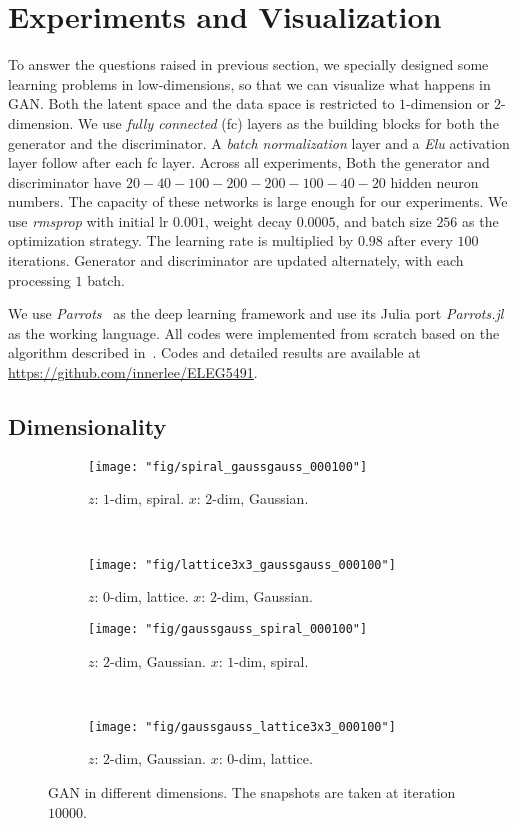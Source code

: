 \section{Experiments and Visualization} \label{sec:exp}

To answer the questions raised in previous section,
we specially designed some learning problems in low-dimensions,
so that we can visualize what happens in GAN.
Both the latent space and the data space is
restricted to $1$-dimension or $2$-dimension.
We use \emph{fully connected} (fc) layers as the building blocks for both
the generator and the discriminator.
A \emph{batch normalization} layer and a \emph{Elu} activation layer
follow after each fc layer.
Across all experiments,
Both the generator and discriminator have
$20-40-100-200-200-100-40-20$ hidden neuron numbers.
The capacity of these networks is large enough for our experiments.
We use \emph{rmsprop} with initial lr $0.001$,
weight decay $0.0005$, and batch size $256$
as the optimization strategy.
The learning rate is multiplied by $0.98$ after every $100$ iterations.
Generator and discriminator are updated alternately,
with each processing $1$ batch.

We use \emph{Parrots}~\cite{parrots} as the deep learning framework
and use its Julia port \emph{Parrots.jl}~\cite{parrotsjl}
as the working language.
All codes were implemented from scratch based on
the algorithm described in~\cite{goodfellow2014generative}.
Codes and detailed results are available at
\url{https://github.com/innerlee/ELEG5491}.

\subsection{Dimensionality}

\begin{figure}[ht]
\centering
    \begin{subfigure}[t]{0.45\textwidth}
        \texttt{[image: "fig/spiral\_gaussgauss\_000100"]}
        \caption{$z$: $1$-dim, spiral.
            $x$: $2$-dim, Gaussian.}
    \end{subfigure}
    ~
    \begin{subfigure}[t]{0.45\textwidth}
        \texttt{[image: "fig/lattice3x3\_gaussgauss\_000100"]}
        \caption{$z$: $0$-dim, lattice.
            $x$: $2$-dim, Gaussian.}
    \end{subfigure}
    \vskip 0.4cm
    \begin{subfigure}[t]{0.45\textwidth}
        \texttt{[image: "fig/gaussgauss\_spiral\_000100"]}
        \caption{$z$: $2$-dim, Gaussian.
            $x$: $1$-dim, spiral.}
    \end{subfigure}
    ~
    \begin{subfigure}[t]{0.45\textwidth}
        \texttt{[image: "fig/gaussgauss\_lattice3x3\_000100"]}
        \caption{$z$: $2$-dim, Gaussian.
            $x$: $0$-dim, lattice.}
    \end{subfigure}
    \caption{\small
        GAN in different dimensions.
        The snapshots are taken at iteration $10000$.
        }
    \label{fig:dim}
\end{figure}

